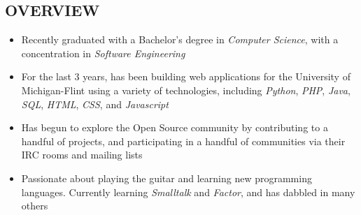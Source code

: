 \documentclass[line,margin]{res}
\begin{document}

\address{1450 Schafer Drive, Burton, MI 48509}
\address{(810) 412-8642}


\begin{resume}


\section{OVERVIEW}
    \begin{itemize}
        \item Recently graduated with a Bachelor's degree in
                {\sl Computer Science}, with a concentration in {\sl Software
                Engineering}
        \item For the last 3 years, has been building web applications
                for the University of Michigan-Flint using a variety of
                technologies, including {\sl Python}, {\sl PHP}, {\sl Java},
                {\sl SQL}, {\sl HTML}, {\sl CSS}, and {\sl Javascript}
        \item Has begun to explore the Open Source community by contributing to
                a handful of projects, and participating in a handful
                of communities via their IRC rooms and mailing lists
        \item Passionate about playing the guitar and learning new programming
                languages. Currently learning {\sl Smalltalk} and {\sl Factor},
                and has dabbled in many others
    \end{itemize}



\end{resume}
\end{document}
